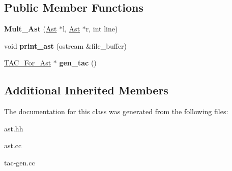 \subsection*{Public Member Functions}
\begin{DoxyCompactItemize}
\item 
\mbox{\label{classMult__Ast_ab2c5f076dc7d34512400b35aaa8069fb}} 
{\bfseries Mult\+\_\+\+Ast} (\hyperlink{classAst}{Ast} $\ast$l, \hyperlink{classAst}{Ast} $\ast$r, int line)
\item 
\mbox{\label{classMult__Ast_acd7447739711e14d94d1a596ace6f616}} 
void {\bfseries print\+\_\+ast} (ostream \&file\+\_\+buffer)
\item 
\mbox{\label{classMult__Ast_aafbf6a8f992fcdd0948fa23190c27674}} 
\hyperlink{classTAC__For__Ast}{T\+A\+C\+\_\+\+For\+\_\+\+Ast} $\ast$ {\bfseries gen\+\_\+tac} ()
\end{DoxyCompactItemize}
\subsection*{Additional Inherited Members}


The documentation for this class was generated from the following files\+:\begin{DoxyCompactItemize}
\item 
ast.\+hh\item 
ast.\+cc\item 
tac-\/gen.\+cc\end{DoxyCompactItemize}
